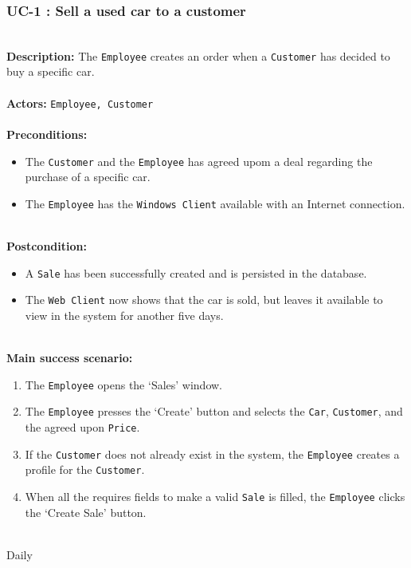 \subsubsection{UC-1 : Sell a used car to a customer}
\label{create_order_use_case}
\HRule \\[0.4cm]
\textbf{Description:} The \texttt{Employee} creates an order when a \texttt{Customer} has decided to buy a specific car. \\
\HRule \\[0.4cm]
\textbf{Actors:} \texttt{Employee, Customer}\\
\HRule \\[0.4cm]
\textbf{Preconditions:} 
\begin{itemize}
    \item The \texttt{Customer} and the \texttt{Employee} has agreed upom a deal regarding the purchase of a specific car.
    \item The \texttt{Employee} has the \texttt{Windows Client} available with an Internet connection.
\end{itemize}
\HRule \\[0.4cm]
\textbf{Postcondition:}
\begin{itemize}
    \item A \texttt{Sale} has been successfully created and is persisted in the database.
    \item The \texttt{Web Client} now shows that the car is sold, but leaves it available to view in the system for another five days.
\end{itemize}
\HRule \\[0.4cm]
\textbf{Main success scenario:}
\begin{enumerate}
    \item The \texttt{Employee} opens the `Sales' window.
    \item The \texttt{Employee} presses the `Create' button and selects the \texttt{Car}, \texttt{Customer}, and the agreed upon \texttt{Price}.
    \item If the \texttt{Customer} does not already exist in the system, the \texttt{Employee} creates a profile for the  \texttt{Customer}.
    \item When all the requires fields to make a valid \texttt{Sale} is filled, the \texttt{Employee} clicks the `Create Sale' button.
\end{enumerate}
\HRule \\[0.4cm]
Daily \\
\HRule \\[0.4cm]

